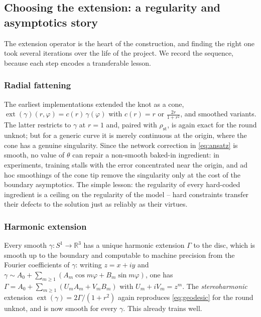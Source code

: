 \documentclass[oneside,british]{amsart}
\numberwithin{equation}{section}
\numberwithin{figure}{section}
\theoremstyle{plain}
\numberwithin{thm}{section}
\theoremstyle{plain}
\theoremstyle{plain}
\theoremstyle{definition}
\theoremstyle{remark}
\DeclareMathOperator{\ext}{\mathrm{ext}}
\begin{document}
\subsection{Choosing the extension: a regularity and asymptotics
story}\label{subsec:extension}

The extension operator is the heart of the construction, and finding
the right one took several iterations over the life of the project. We
record the sequence, because each step encodes a transferable lesson.

\subsubsection*{Radial fattening}
The earliest implementations extended the knot as a cone,
$\ext(\gamma)(r,\varphi)=c(r)\,\gamma(\varphi)$ with $c(r)=r$ or
$\frac{2r}{1+r^{2}}$, and smoothed variants. The latter restricts to
$\gamma$ at $r=1$ and, paired with $\rho_{\mathrm{st}}$, is again exact
for the round unknot; but for a generic curve it is merely continuous
at the origin, where the cone has a genuine singularity. Since the
network correction in \eqref{eq:ansatz} is smooth, no value of $\theta$
can repair a non-smooth baked-in ingredient: in experiments, training
stalls with the error concentrated near the origin, and ad hoc
smoothings of the cone tip remove the singularity only at the cost of
the boundary asymptotics. The simple lesson:
the regularity of every hard-coded ingredient is a ceiling on
the regularity of the model -- hard constraints transfer their
defects to the solution just as reliably as their virtues.

\subsubsection*{Harmonic extension}
Every smooth $\gamma:S^{1}\to\mathbb{R}^{3}$ has a unique harmonic
extension $\Gamma$ to the disc, which is smooth up to the boundary and
computable to machine precision from the Fourier coefficients of
$\gamma$: writing $z=x+iy$ and
$\gamma\sim A_{0}+\sum_{m\ge1}(A_{m}\cos m\varphi+B_{m}\sin m\varphi)$,
one has
$\Gamma=A_{0}+\sum_{m\ge1}\left(U_{m}A_{m}+V_{m}B_{m}\right)$ with
$U_{m}+iV_{m}=z^{m}$. The \emph{stereoharmonic} extension
$\ext(\gamma)=2\Gamma/(1+r^{2})$ again reproduces
\eqref{eq:geodesic} for the round unknot, and is now smooth for every
$\gamma$. This already trains well.
\end{document}
